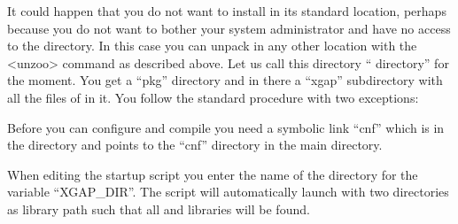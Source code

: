 It could happen that you do not want to install {\XGAP} in its standard
location, perhaps because you do not want to bother your system
administrator and have no access to the {\GAP} directory. In this case you
can unpack {\XGAP} in any other location with the <unzoo> command as
described above. Let us call this directory ``{\XGAP} directory'' for the
moment. You get a ``pkg'' directory and in there a ``xgap''
subdirectory with all the files of {\XGAP} in it. You follow the
standard procedure with two exceptions:

Before you can configure and compile {\XGAP} you need a symbolic link
``cnf'' which is in the {\XGAP} directory and points to the ``cnf''
directory in the main {\GAP} directory.

When editing the startup script you enter the name of the {\XGAP} directory 
for the variable ``XGAP_DIR''. The script will automatically launch {\GAP}
with two directories as library path such that all {\GAP} and {\XGAP}
libraries will be found.

